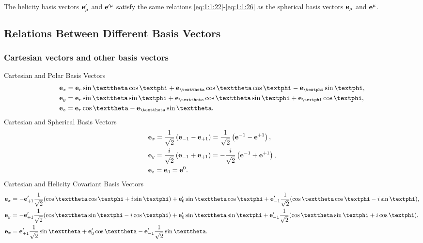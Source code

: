 The helicity basis vectors \(\mathbf{e}_{\mu}^{\prime}\) and \(\mathbf{e}^{\prime \mu}\) satisfy the same relations \eqref{eq:1:1:22}-\eqref{eq:1:1:26} as the spherical basis vectors \(\mathbf{e}_{\mu}\) and \(\mathbf{e}^{\mu}\).

\subsection{Relations Between Different Basis Vectors}\label{sec:1.1.5}
\subsubsection{Cartesian vectors and other basis vectors}
Cartesian and Polar Basis Vectors
\begin{align}
& \vect{e}_{x}=\vect{e}_{r} \sin \vartheta \cos \varphi+\vect{e}_{\vartheta} \cos \vartheta \cos \varphi-\vect{e}_{\varphi} \sin \varphi,  \notag\\
& \vect{e}_{y}=\vect{e}_{r} \sin \vartheta \sin \varphi+\vect{e}_{\vartheta} \cos \vartheta \sin \varphi+\vect{e}_{\varphi} \cos \varphi,  \label{eq:1:1:29}\\
& \vect{e}_{z}=\vect{e}_{r} \cos \vartheta-\vect{e}_{\vartheta} \sin \vartheta . \notag
\end{align}
Cartesian and Spherical Basis Vectors
\begin{align}
& \mathbf{e}_{x}=\frac{1}{\sqrt{2}}\left(\mathbf{e}_{-1}-\mathbf{e}_{+1}\right)=\frac{1}{\sqrt{2}}\left(\mathbf{e}^{-1}-\mathbf{e}^{+1}\right),  \notag\\
& \mathbf{e}_{y}=\frac{i}{\sqrt{2}}\left(\mathbf{e}_{-1}+\mathbf{e}_{+1}\right)=-\frac{i}{\sqrt{2}}\left(\mathbf{e}^{-1}+\mathbf{e}^{+1}\right),  \label{eq:1:1:30}\\
& \mathbf{e}_{z}=\mathbf{e}_{0}=\mathbf{e}^{0} . \notag
\end{align}
Cartesian and Helicity Covariant Basis Vectors
\begin{align}
& \vect{e}_{x}=-\vect{e}_{+1}^{\prime} \frac{1}{\sqrt{2}}(\cos \vartheta \cos \varphi+i \sin \varphi)+\vect{e}_{0}^{\prime} \sin \vartheta \cos \varphi+\vect{e}_{-1}^{\prime} \frac{1}{\sqrt{2}}(\cos \vartheta \cos \varphi-i \sin \varphi),  \notag\\
& \vect{e}_{y}=-\vect{e}_{+1}^{\prime} \frac{1}{\sqrt{2}}(\cos \vartheta \sin \varphi-i \cos \varphi)+\vect{e}_{0}^{\prime} \sin \vartheta \sin \varphi+\vect{e}_{-1}^{\prime} \frac{1}{\sqrt{2}}(\cos \vartheta \sin \varphi+i \cos \varphi),  \label{eq:1:1:31}\\
& \vect{e}_{x}=\vect{e}_{+1}^{\prime} \frac{1}{\sqrt{2}} \sin \vartheta+\vect{e}_{0}^{\prime} \cos \vartheta-\vect{e}_{-1}^{\prime} \frac{1}{\sqrt{2}} \sin \vartheta . \notag
\end{align}

